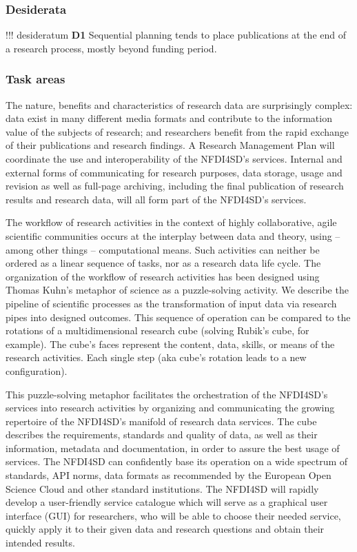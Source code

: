 \hypertarget{desiderata}{%
\subsubsection{Desiderata}\label{desiderata}}

!!! desideratum \textbf{D1} Sequential planning tends to place
publications at the end of a research process, mostly beyond funding
period.

\hypertarget{task-areas}{%
\subsubsection{Task areas}\label{task-areas}}

The nature, benefits and characteristics of research data are
surprisingly complex: data exist in many different media formats and
contribute to the information value of the subjects of research; and
researchers benefit from the rapid exchange of their publications and
research findings. A Research Management Plan will coordinate the use
and interoperability of the NFDI4SD's services. Internal and external
forms of communicating for research purposes, data storage, usage and
revision as well as full-page archiving, including the final publication
of research results and research data, will all form part of the
NFDI4SD's services.

The workflow of research activities in the context of highly
collaborative, agile scientific communities occurs at the interplay
between data and theory, using -- among other things -- computational
means. Such activities can neither be ordered as a linear sequence of
tasks, nor as a research data life cycle. The organization of the
workflow of research activities has been designed using Thomas Kuhn's
metaphor of science as a puzzle-solving activity. We describe the
pipeline of scientific processes as the transformation of input data via
research pipes into designed outcomes. This sequence of operation can be
compared to the rotations of a multidimensional research cube (solving
Rubik's cube, for example). The cube's faces represent the content,
data, skills, or means of the research activities. Each single step (aka
cube's rotation leads to a new configuration).

This puzzle-solving metaphor facilitates the orchestration of the
NFDI4SD's services into research activities by organizing and
communicating the growing repertoire of the NFDI4SD's manifold of
research data services. The cube describes the requirements, standards
and quality of data, as well as their information, metadata and
documentation, in order to assure the best usage of services. The
NFDI4SD can confidently base its operation on a wide spectrum of
standards, API norms, data formats as recommended by the European Open
Science Cloud and other standard institutions. The NFDI4SD will rapidly
develop a user-friendly service catalogue which will serve as a
graphical user interface (GUI) for researchers, who will be able to
choose their needed service, quickly apply it to their given data and
research questions and obtain their intended results.

